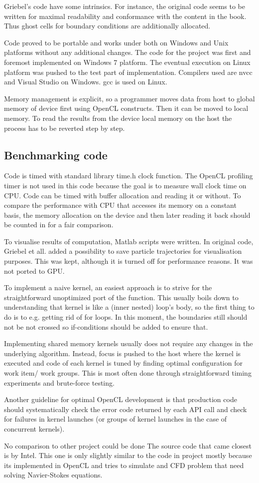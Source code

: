 Griebel's code have some intrinsics. For instance, the original code seems to be written for maximal readability and conformance with the content in the book. Thus ghost cells for boundary conditions are additionally allocated.

Code proved to be portable and works under both on Windows and Unix platforms without any additional changes. The code for the project was first and foremost implemented on Windows 7 platform. The eventual execution on Linux platform was pushed to the test part of implementation. Compilers used are nvcc and Visual Studio on Windows. gcc is used on Linux.

Memory management is explicit, so a programmer moves data from host to global memory of device first using OpenCL constructs. Then it can be moved to local memory. To read the results from the device local memory on the host the process has to be reverted step by step.

\subsection{Benchmarking code}
Code is timed with standard library time.h clock function. The OpenCL profiling timer is not used in this code because the goal is to measure wall clock time on CPU. Code can be timed with buffer allocation and reading it or without. To compare the performance with CPU that accesses its memory on a constant basis, the memory allocation on the device and then later reading it back should be counted in for a fair comparison.

To visualise results of computation, Matlab scripts were written. In original code, Griebel et all. added a possibility to save particle trajectories for visualisation purposes. This was kept, although it is turned off for performance reasons. It was not ported to GPU.

To implement a naive kernel, an easiest approach is to strive for the straightforward unoptimized port of the function. This usually boils down to understanding that kernel is like a (inner nested) loop's body, so the first thing to do is to e.g. getting rid of for loops. In this moment, the boundaries still should not be not crossed so if-conditions should be added to ensure that.

Implementing shared memory kernels usually does not require any changes in the underlying algorithm. Instead, focus is pushed to the host where the kernel is executed and code of each kernel is tuned by finding optimal configuration for work item/ work groups. This is most often done through straightforward timing experiments and brute-force testing.

Another guideline for optimal OpenCL development is that production code should systematically check the error code returned by each API call and check for failures in kernel launches (or groups of kernel launches in the case of concurrent kernels). 

No comparison to other project could be done The source code that came closest is by Intel\cite{intel2012fluid}.  This one is only slightly similar to the code in project mostly because its implemented in OpenCL and tries to simulate and CFD problem that need solving Navier-Stokes equations. 